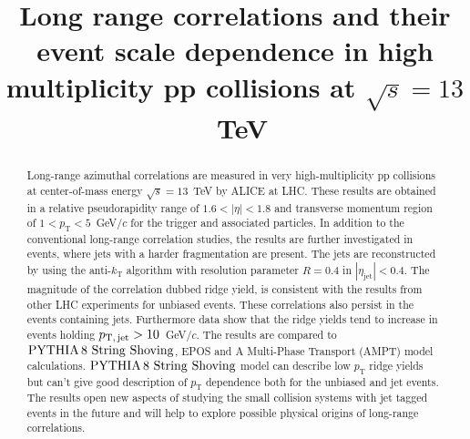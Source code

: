\documentclass[ALICE,manyauthors]{cernphprep}
\begin{document}
\begin{titlepage}

\PHyear{}
\PHdate{\today}
%

\title{Long range correlations and their event scale dependence in high multiplicity pp collisions at $\sqrt{s} = 13$~TeV}


\begin{abstract}
%

Long-range azimuthal correlations are measured in very high-multiplicity pp collisions at center-of-mass energy $\sqrt{s} = 13$~TeV by ALICE at LHC. 
These results are obtained in a relative pseudorapidity range of $1.6 < |\eta| < 1.8$ and transverse momentum region of $1 < p_{\mathrm T} < 5$~GeV/$c$ for the trigger and associated particles.
In addition to the conventional long-range correlation studies, the results are further investigated in events, where jets with a harder fragmentation are present.
The jets are reconstructed by using the anti-$k_\mathrm{T}$ algorithm with resolution parameter $R=0.4$ in $|\eta_\mathrm{jet}|<0.4$. 
The magnitude of the correlation dubbed ridge yield, is consistent with the results from other LHC experiments for unbiased events. 
These correlations also persist in the events containing jets. Furthermore data show that the ridge yields tend to increase in events holding $p_\mathrm{T,\,jet} > 10$~GeV/$c$.
The results are compared to $\mathrm{PYTHIA}\,8~\mathrm{String}~\mathrm{Shoving}$, EPOS and A Multi-Phase Transport ({AMPT}) model calculations.  
$\mathrm{PYTHIA}\,8~\mathrm{String}~\mathrm{Shoving}$ model can describe low $p_{\mathrm T}$  ridge yields but can't give good description of  $p_{\mathrm T}$ dependence both for the unbiased and jet events.
The results open new aspects of studying the small collision systems with jet tagged events in the future and will help to explore possible physical origins of long-range correlations.

\end{abstract}

\end{titlepage}
\end{document}
